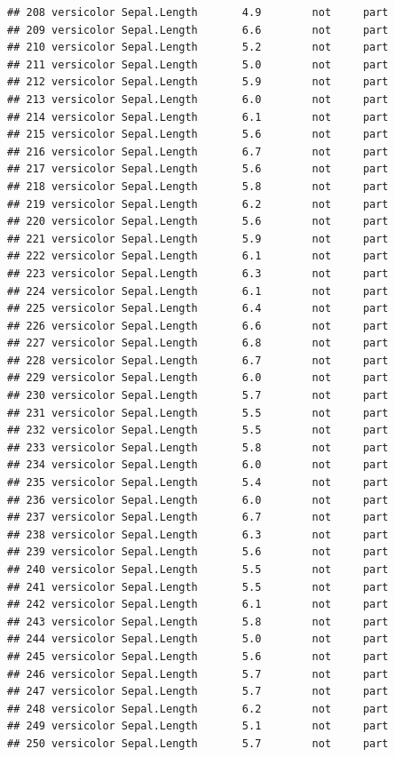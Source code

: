 \documentclass[krantz2]{krantz}\usepackage{knitr}%
\begin{document}
\begin{knitrout}
\begin{kframe}
\begin{verbatim}
## 208 versicolor Sepal.Length       4.9        not     part
## 209 versicolor Sepal.Length       6.6        not     part
## 210 versicolor Sepal.Length       5.2        not     part
## 211 versicolor Sepal.Length       5.0        not     part
## 212 versicolor Sepal.Length       5.9        not     part
## 213 versicolor Sepal.Length       6.0        not     part
## 214 versicolor Sepal.Length       6.1        not     part
## 215 versicolor Sepal.Length       5.6        not     part
## 216 versicolor Sepal.Length       6.7        not     part
## 217 versicolor Sepal.Length       5.6        not     part
## 218 versicolor Sepal.Length       5.8        not     part
## 219 versicolor Sepal.Length       6.2        not     part
## 220 versicolor Sepal.Length       5.6        not     part
## 221 versicolor Sepal.Length       5.9        not     part
## 222 versicolor Sepal.Length       6.1        not     part
## 223 versicolor Sepal.Length       6.3        not     part
## 224 versicolor Sepal.Length       6.1        not     part
## 225 versicolor Sepal.Length       6.4        not     part
## 226 versicolor Sepal.Length       6.6        not     part
## 227 versicolor Sepal.Length       6.8        not     part
## 228 versicolor Sepal.Length       6.7        not     part
## 229 versicolor Sepal.Length       6.0        not     part
## 230 versicolor Sepal.Length       5.7        not     part
## 231 versicolor Sepal.Length       5.5        not     part
## 232 versicolor Sepal.Length       5.5        not     part
## 233 versicolor Sepal.Length       5.8        not     part
## 234 versicolor Sepal.Length       6.0        not     part
## 235 versicolor Sepal.Length       5.4        not     part
## 236 versicolor Sepal.Length       6.0        not     part
## 237 versicolor Sepal.Length       6.7        not     part
## 238 versicolor Sepal.Length       6.3        not     part
## 239 versicolor Sepal.Length       5.6        not     part
## 240 versicolor Sepal.Length       5.5        not     part
## 241 versicolor Sepal.Length       5.5        not     part
## 242 versicolor Sepal.Length       6.1        not     part
## 243 versicolor Sepal.Length       5.8        not     part
## 244 versicolor Sepal.Length       5.0        not     part
## 245 versicolor Sepal.Length       5.6        not     part
## 246 versicolor Sepal.Length       5.7        not     part
## 247 versicolor Sepal.Length       5.7        not     part
## 248 versicolor Sepal.Length       6.2        not     part
## 249 versicolor Sepal.Length       5.1        not     part
## 250 versicolor Sepal.Length       5.7        not     part

\end{verbatim}
\end{kframe}
\end{knitrout}
\end{document}

